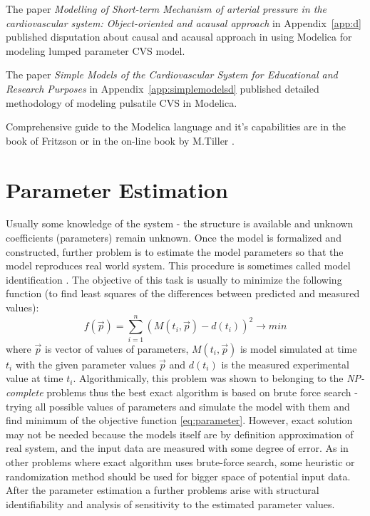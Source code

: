 The paper \cite{Kulhanek2014Modeling} \emph{Modelling of Short-term Mechanism of arterial pressure in the cardiovascular system: Object-oriented and acausal approach} in Appendix~\ref{app:d} published disputation about causal and acausal approach in using Modelica for modeling lumped parameter CVS model. 

The paper \cite{Kulhanek2014mefanet} \emph{Simple Models of the Cardiovascular System for Educational and Research Purposes} in Appendix~\ref{app:simplemodelsd} published detailed methodology of modeling pulsatile CVS in Modelica. 

Comprehensive guide to the Modelica language and it's capabilities are in the book of Fritzson \cite{fritzson2002} or in the on-line book by M.Tiller \cite{Tiller2014}.

\section{Parameter Estimation}
\label{sec:estimation}

Usually some knowledge of the system - the structure is available and unknown coefficients (parameters) remain unknown. Once the model is formalized and constructed, further problem is to estimate the model parameters so that the model reproduces real world system. This procedure is sometimes called model identification \cite[p.~159]{khoo2000}. The objective of this task is usually to minimize the following function (to find least squares of the differences between predicted and measured values):
\begin{equation} \label{eq:parameter} 
f( \vec{p} ) = \sum_{i=1}^{n} ( M(t_{i},\vec{p} ) - d(t_{i}) )^2 \to min  
\end{equation} 
where $\vec{p}$ is vector of values of parameters, $M(t_{i},\vec{p})$ is model simulated at time $t_{i} $ with the given parameter values $\vec{p}$ and $d(t_{i})$ is the measured experimental value at time $t_{i}$.
Algorithmically, this problem was shown to belonging to the \emph{NP-complete} problems \cite{Hofmann2005} thus the best exact algorithm is based on brute force search - trying all possible values of parameters and simulate the model with them and find minimum of the objective function \ref{eq:parameter}. 
However, exact solution may not be needed because the models itself are by definition approximation of real system, and the input data are measured with some degree of error. 
As in other problems where exact algorithm uses brute-force search, some heuristic or randomization method should be used for bigger space of potential input data. 
After the parameter estimation a further problems arise with structural identifiability and analysis of sensitivity to the estimated parameter values\cite[p.~176]{khoo2000}. 

